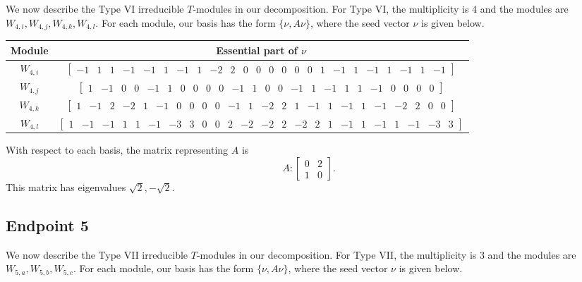 \documentclass[12pt,letterpaper]{article}
\newcommand{\rowvector}[1]{\begin{bmatrix} #1 \end{bmatrix}}
\begin{document}
We now describe the Type VI irreducible $T$-modules in our decomposition.
For Type VI, the multiplicity is 4 and the modules are $W_{4,i}, W_{4,j}, W_{4,k}, W_{4,l}$.
For each module, our basis has the form $\{\nu, A\nu\}$, where the seed vector $\nu$ is given below.

{
\setlength{\arraycolsep}{3pt}
\begin{center}
    \begin{tabular}{c | c}
    \toprule
       \textbf{Module}  & \textbf{Essential part of }$\nu$ \\
       \midrule
       $W_{4,i}$ & $\rowvector{-1 & 1 & 1 & -1 & -1 & 1 & -1 & 1 & -2 & 2 & 0 & 0 & 0 & 0 & 0 & 0 & 1 & -1 & 1 & -1 & 1 & -1 & 1 & -1}$ \\[1.67pt]
       $W_{4,j}$ & $\rowvector{1 & -1 & 0 & 0 & -1 & 1 & 0 & 0 & 0 & 0 & -1 & 1 & 0 & 0 & -1 & 1 & -1 & 1 & 1 & -1 & 0 & 0 & 0 & 0}$ \\[1.67pt]
       $W_{4,k}$ & $\rowvector{1 & -1 & 2 & -2 & 1 & -1 & 0 & 0 & 0 & 0 & -1 & 1 & -2 & 2 & 1 & -1 & 1 & -1 & 1 & -1 & -2 & 2 & 0 & 0}$ \\[1.67pt]
       $W_{4,l}$ & $\rowvector{1 & -1 & -1 & 1 & 1 & -1 & -3 & 3 & 0 & 0 & 2 & -2 & -2 & 2 & -2 & 2 & 1 & -1 & 1 & -1 & 1 & -1 & -3 & 3}$ \\
    \bottomrule
    \end{tabular}
\end{center}
}

With respect to each basis, the matrix representing $A$ is 
\begin{equation}
    A: \begin{bmatrix}
  0 & 2 \\
  1 & 0 \end{bmatrix}.
\label{eq:t12v2-VI}
\end{equation}
This matrix has eigenvalues $\sqrt{2}, -\sqrt{2}$.

\subsection{Endpoint 5}

We now describe the Type VII irreducible $T$-modules in our decomposition.
For Type VII, the multiplicity is 3 and the modules are $W_{5,a}, W_{5,b}, W_{5,c}$.
For each module, our basis has the form $\{\nu, A\nu\}$, where the seed vector $\nu$ is given below.
\end{document}
